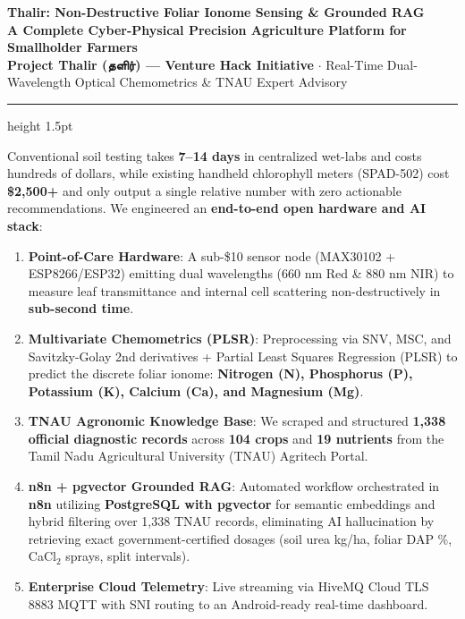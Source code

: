 \documentclass[11pt,a4paper,landscape]{article}
\begin{document}
\begin{center}
    {\Huge \textbf{\color{primary} Thalir: Non-Destructive Foliar Ionome Sensing \& Grounded RAG}} \\[6pt]
    {\large \textbf{A Complete Cyber-Physical Precision Agriculture Platform for Smallholder Farmers}} \\[4pt]
    {\small \textbf{Project Thalir (தளிர்) — Venture Hack Initiative} $\cdot$ Real-Time Dual-Wavelength Optical Chemometrics \& TNAU Expert Advisory}
\end{center}

\vspace{0.2cm}
\hrule height 1.5pt \color{primary}
\vspace{0.4cm}

\begin{tcolorbox}[colback=primary!5!white,colframe=primary,title=\textbf{Executive Summary: What We Built \& The Problem We Solve},arc=3mm]
Conventional soil testing takes \textbf{7--14 days} in centralized wet-labs and costs hundreds of dollars, while existing handheld chlorophyll meters (SPAD-502) cost \textbf{\$2,500+} and only output a single relative number with zero actionable recommendations. 
We engineered an \textbf{end-to-end open hardware and AI stack}:
\begin{enumerate}[leftmargin=*]
    \item \textbf{Point-of-Care Hardware}: A sub-\$10 sensor node (MAX30102 + ESP8266/ESP32) emitting dual wavelengths ($660\text{ nm}$ Red \& $880\text{ nm}$ NIR) to measure leaf transmittance and internal cell scattering non-destructively in \textbf{sub-second time}.
    \item \textbf{Multivariate Chemometrics (PLSR)}: Preprocessing via SNV, MSC, and Savitzky-Golay 2nd derivatives + Partial Least Squares Regression (PLSR) to predict the discrete foliar ionome: \textbf{Nitrogen (N), Phosphorus (P), Potassium (K), Calcium (Ca), and Magnesium (Mg)}.
    \item \textbf{TNAU Agronomic Knowledge Base}: We scraped and structured \textbf{1,338 official diagnostic records} across \textbf{104 crops} and \textbf{19 nutrients} from the Tamil Nadu Agricultural University (TNAU) Agritech Portal.
    \item \textbf{n8n + pgvector Grounded RAG}: Automated workflow orchestrated in \textbf{n8n} utilizing \textbf{PostgreSQL with pgvector} for semantic embeddings and hybrid filtering over 1,338 TNAU records, eliminating AI hallucination by retrieving exact government-certified dosages (soil urea kg/ha, foliar DAP \%, CaCl$_2$ sprays, split intervals).
    \item \textbf{Enterprise Cloud Telemetry}: Live streaming via HiveMQ Cloud TLS 8883 MQTT with SNI routing to an Android-ready real-time dashboard.
\end{enumerate}
\end{tcolorbox}
\end{document}

